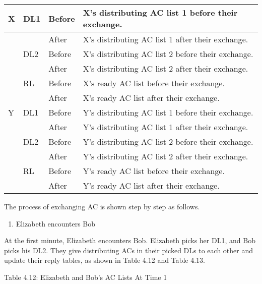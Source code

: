 \begin{tabular}{|p{0.2in}|p{0.3in}|p{0.4in}|p{1.9in}|} \hline 
X & DL1 & Before & X's distributing AC list 1 before their exchange. \\ \hline 
 &  & After & X's distributing AC list 1 after their exchange. \\ \hline 
 & DL2 & Before & X's distributing AC list 2 before their exchange. \\ \hline 
 &  & After & X's distributing AC list 2 after their exchange. \\ \hline 
 & RL & Before & X's ready AC list before their exchange. \\ \hline 
 &  & After & X's ready AC list after their exchange. \\ \hline 
Y & DL1 & Before & Y's distributing AC list 1 before their exchange. \\ \hline 
 &  & After & Y's distributing AC list 1 after their exchange. \\ \hline 
 & DL2 & Before & Y's distributing AC list 2 before their exchange. \\ \hline 
 &  & After & Y's distributing AC list 2 after their exchange. \\ \hline 
 & RL & Before & Y's ready AC list before their exchange. \\ \hline 
 &  & After & Y's ready AC list after their exchange. \\ \hline 
\end{tabular}

The process of exchanging AC is shown step by step as follows.

\begin{enumerate}
\item  Elizabeth encounters Bob
\end{enumerate}

\noindent At the first minute, Elizabeth encounters Bob. Elizabeth picks her DL1, and Bob picks his DL2. They give distributing ACs in their picked DLs to each other and update their reply tables, as shown in Table 4.12 and Table 4.13.

Table 4.12: Elizabeth and Bob's AC Lists At Time 1

